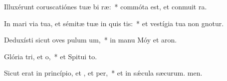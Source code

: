\item Illuxérunt coruscatiónes tuæ bi ræ:~* commóta est, et conmuit ra.
\item In mari via tua, et sémitæ tuæ in quis tis:~* et vestígia tua non gnotur.
\item Deduxísti sicut oves pulum um,~* in manu Móy et aron.
\item Glória tri, et o,~* et Spitui to.
\item Sicut erat in princípio, et , et per,~* et in sǽcula sæcurum. men.

